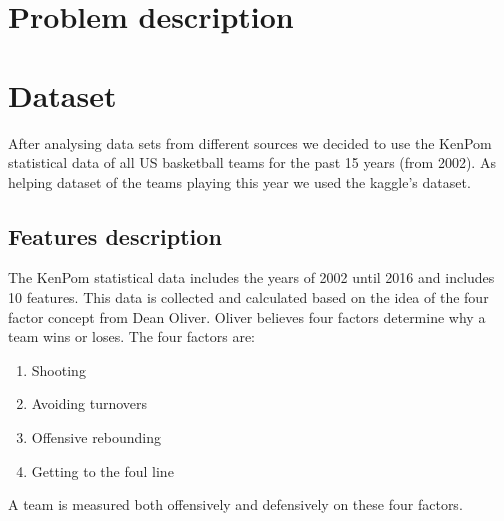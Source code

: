 \documentclass[
10pt, %
a4paper, %
oneside, %
headinclude,footinclude, %
BCOR5mm, %
]{scrartcl}
\begin{document}





\section{Problem description}
 

\section{Dataset}
After analysing data sets from different sources we decided to use the KenPom statistical data of all US basketball teams for the past 15 years (from 2002). As helping dataset of the teams playing this year we used the kaggle's dataset.
\subsection{Features description}
The KenPom statistical data includes the years of 2002 until 2016 and includes 10 features. This data is collected and calculated based on the idea of the four factor concept from Dean Oliver.
Oliver believes four factors determine why a team wins or loses. The four factors are:
\begin{enumerate}
\item Shooting
\item Avoiding turnovers
\item Offensive rebounding
\item Getting to the foul line
\end{enumerate}
A team is measured both offensively and defensively on these four factors.
\end{document}
